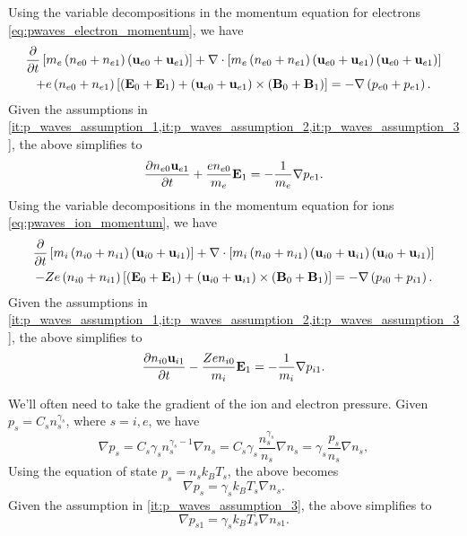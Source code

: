 \documentclass[a4paper,11pt]{report}
\begin{document}
Using the variable decompositions in the momentum equation for electrons \cref{eq:pwaves_electron_momentum}, we have 
\begin{multline*}
    \frac{\partial}{\partial t} \left [ m_e \left ( n_{e0} + n_{e1} \right ) \left ( \mathbf{u}_{e0} + \mathbf{u}_{e1} \right ) \right ] + \nabla \cdot \left [ m_e \left ( n_{e0} + n_{e1} \right ) \left ( \mathbf{u}_{e0} + \mathbf{u}_{e1} \right ) \left ( \mathbf{u}_{e0} + \mathbf{u}_{e1} \right ) \right ] \\
    + e \left ( n_{e0} + n_{e1} \right ) \left [ \left ( \mathbf{E}_0 + \mathbf{E}_1 \right ) + \left ( \mathbf{u}_{e0} + \mathbf{u}_{e1} \right ) \times \left ( \mathbf{B}_0 + \mathbf{B}_1 \right ) \right ] = -\nabla \left ( p_{e0} + p_{e1} \right ).
\end{multline*}
Given the assumptions in \cref{it:p_waves_assumption_1,it:p_waves_assumption_2,it:p_waves_assumption_3}, the above simplifies to
\begin{equation}
    \label{eq:p_waves_e_mom_linearized}
    \frac{\partial n_{e0} \mathbf{u}_{e1}}{\partial t} + \frac{e n_{e0}}{m_e} \mathbf{E}_1 = - \frac{1}{m_e} \nabla p_{e1} .
\end{equation}
Using the variable decompositions in the momentum equation for ions \cref{eq:pwaves_ion_momentum}, we have 
\begin{multline*}
    \frac{\partial}{\partial t} \left [ m_i \left ( n_{i0} + n_{i1} \right ) \left ( \mathbf{u}_{i0} + \mathbf{u}_{i1} \right ) \right ] + \nabla \cdot \left [ m_i \left ( n_{i0} + n_{i1} \right ) \left ( \mathbf{u}_{i0} + \mathbf{u}_{i1} \right ) \left ( \mathbf{u}_{i0} + \mathbf{u}_{i1} \right ) \right ] \\
    - Z e \left ( n_{i0} + n_{i1} \right ) \left [ \left ( \mathbf{E}_0 + \mathbf{E}_1 \right ) + \left ( \mathbf{u}_{i0} + \mathbf{u}_{i1} \right ) \times \left ( \mathbf{B}_0 + \mathbf{B}_1 \right ) \right ] = -\nabla \left ( p_{i0} + p_{i1} \right ).
\end{multline*}
Given the assumptions in \cref{it:p_waves_assumption_1,it:p_waves_assumption_2,it:p_waves_assumption_3}, the above simplifies to
\begin{equation}
    \label{eq:p_waves_i_mom_linearized}
    \frac{\partial n_{i0} \mathbf{u}_{i1}}{\partial t} - \frac{Z e n_{i0}}{m_i} \mathbf{E}_1 = - \frac{1}{m_i}\nabla p_{i1}.
\end{equation}

We'll often need to take the gradient of the ion and electron pressure. Given $p_s = C_s n_s^{\gamma_s}$, where $s = i,e$, we have 
\begin{equation*}
    \nabla p_s = C_s \gamma_s n_s^{\gamma_s-1} \nabla n_s = C_s \gamma_s \frac{n_s^{\gamma_s}}{n_s} \nabla n_s = \gamma_s \frac{p_s}{n_s} \nabla n_s,
\end{equation*}
Using the equation of state $p_s = n_s k_B T_s$, the above becomes
\begin{equation}
    \nabla p_s = \gamma_s k_B T_s \nabla n_s.
\end{equation}
Given the assumption in \cref{it:p_waves_assumption_3}, the above simplifies to
\begin{equation}
    \label{eq:p_waves_pressure_gradient}
    \nabla p_{s 1} = \gamma_s k_B T_s \nabla n_{s 1}.
\end{equation}
\end{document}
